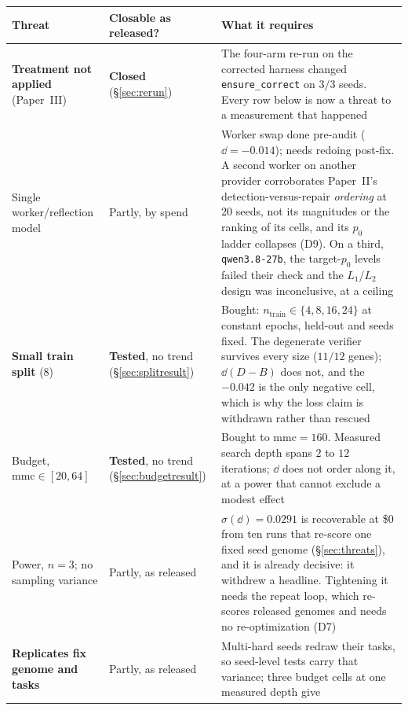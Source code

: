 \documentclass[11pt]{article}
\begin{document}
\begin{table}[h]
\centering
\footnotesize
\begin{tabular}{p{}p{}p{}}
\toprule
Threat & Closable as released? & What it requires \\
\midrule
\textbf{Treatment not applied} (Paper~III) & \textbf{Closed} (\S\ref{sec:rerun}) &
  The four-arm re-run on the corrected harness changed \texttt{ensure\_correct} on $3/3$
  seeds. Every row below is now a threat to a measurement that happened \\
Single worker/reflection model & Partly, by spend & Worker swap done pre-audit
  ($\dd=-0.014$); needs redoing post-fix. A second worker on another provider corroborates
  Paper~II's detection-versus-repair \emph{ordering} at $20$ seeds, not its magnitudes or the
  ranking of its cells, and its $p_0$ ladder collapses (D9). On a third, \texttt{qwen3.8-27b}, the target-$p_0$ levels
  failed their check and the $L_1$/$L_2$ design was inconclusive, at a ceiling \\
\textbf{Small train split} ($8$) & \textbf{Tested}, no trend (\S\ref{sec:splitresult}) & Bought:
  $n_{\mathrm{train}} \in \{4,8,16,24\}$ at constant epochs, held-out and seeds fixed. The
  degenerate verifier survives every size ($11/12$ genes); $\dd(D-B)$ does not, and the
  $-0.042$ is the only negative cell, which is why the loss claim is withdrawn rather than
  rescued \\
Budget, $\mathrm{mmc}\in[20,64]$ & \textbf{Tested}, no trend (\S\ref{sec:budgetresult}) & Bought to
  $\mathrm{mmc}{=}160$. Measured search depth spans $2$ to $12$ iterations; $\dd$ does not
  order along it, at a power that cannot exclude a modest effect \\
Power, $n{=}3$; no sampling variance & Partly, as released & $\sigma(\dd) = 0.0291$ is
  recoverable at \$0 from ten runs that re-score one fixed seed genome (\S\ref{sec:threats}),
  and it is already decisive: it withdrew a headline. Tightening it needs the repeat loop,
  which re-scores released genomes and needs no re-optimization (D7) \\
\textbf{Replicates fix genome and tasks} & Partly, as released & Multi-hard seeds redraw their
  tasks, so seed-level tests carry that variance; three budget cells at one measured depth give

\end{tabular}
\end{table}
\end{document}
